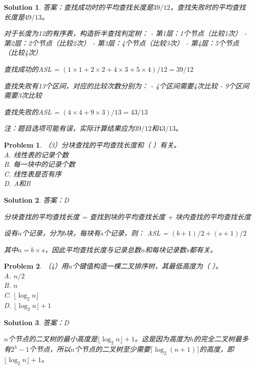\documentclass[12pt,a4paper]{amsart}
\newtheorem{problem}{Problem}[section]
\newtheorem{solution}{Solution}[section]
\begin{document}
\begin{solution}
答案：查找成功时的平均查找长度是$39/12$，查找失败时的平均查找长度是$49/13$。

对于长度为12的有序表，构造折半查找判定树：
- 第1层：1个节点（比较1次）
- 第2层：2个节点（比较2次）
- 第3层：4个节点（比较3次）  
- 第4层：5个节点（比较4次）

查找成功的ASL = $(1×1 + 2×2 + 4×3 + 5×4)/12 = 39/12$

查找失败有13个区间，对应的比较次数分别为：
- 4个区间需要4次比较
- 9个区间需要3次比较

查找失败的ASL = $(4×4 + 9×3)/13 = 43/13$

注：题目选项可能有误，实际计算结果应为$39/12$和$43/13$。
\end{solution}

\begin{problem}
（3）分块查找的平均查找长度和（ ）有关。\\
A. 线性表的记录个数\\
B. 每一块中的记录个数\\
C. 线性表是否有序\\
D. A和B
\end{problem}

\begin{solution}
答案：D

分块查找的平均查找长度 = 查找到块的平均查找长度 + 块内查找的平均查找长度

设有$n$个记录，分为$b$块，每块有$s$个记录，则：
ASL = $(b+1)/2 + (s+1)/2$

其中$n = b×s$，因此平均查找长度与记录总数$n$和每块记录数$s$都有关。
\end{solution}

\begin{problem}
（4）用$n$个键值构造一棵二叉排序树，其最低高度为（ ）。\\
A. $n/2$\\
B. $n$\\
C. $\lfloor\log_2 n\rfloor$\\
D. $\lfloor\log_2 n\rfloor + 1$
\end{problem}

\begin{solution}
答案：D

$n$个节点的二叉树的最小高度是$\lfloor\log_2 n\rfloor + 1$。这是因为高度为$h$的完全二叉树最多有$2^h - 1$个节点，所以$n$个节点的二叉树至少需要$\lceil\log_2(n+1)\rceil$的高度，即$\lfloor\log_2 n\rfloor + 1$。
\end{solution}
\end{document}

